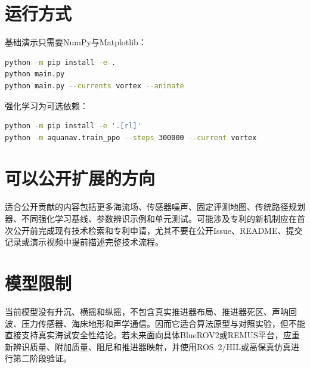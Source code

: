 \documentclass[11pt,a4paper]{ctexart}
\begin{document}
\section{运行方式}

基础演示只需要NumPy与Matplotlib：
\begin{lstlisting}[language=bash]
python -m pip install -e .
python main.py
python main.py --currents vortex --animate
\end{lstlisting}

强化学习为可选依赖：
\begin{lstlisting}[language=bash]
python -m pip install -e '.[rl]'
python -m aquanav.train_ppo --steps 300000 --current vortex
\end{lstlisting}

\section{可以公开扩展的方向}

适合公开贡献的内容包括更多海流场、传感器噪声、固定评测地图、传统路径规划器、不同强化学习基线、参数辨识示例和单元测试。可能涉及专利的新机制应在首次公开前完成现有技术检索和专利申请，尤其不要在公开Issue、README、提交记录或演示视频中提前描述完整技术流程。

\section{模型限制}

当前模型没有升沉、横摇和纵摇，不包含真实推进器布局、推进器死区、声呐回波、压力传感器、海床地形和声学通信。因而它适合算法原型与对照实验，但不能直接支持真实海试安全性结论。若未来面向具体BlueROV2或REMUS平台，应重新辨识质量、附加质量、阻尼和推进器映射，并使用ROS~2/HIL或高保真仿真进行第二阶段验证。
\end{document}
